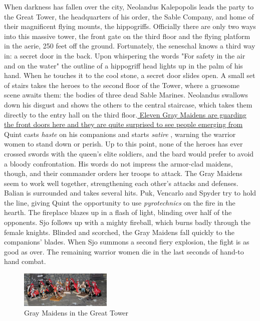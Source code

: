 When darkness has fallen over the city, Neolandus Kalepopolis leads the party to the Great Tower, the headquarters of his order, the Sable Company, and home of their magnificent flying mounts, the hippogriffs. Officially there are only two ways into this massive tower, the front gate on the third floor and the flying platform in the aerie, 250 feet off the ground. Fortunately, the seneschal knows a third way in: a secret door in the back. Upon whispering the words "For safety in the air and on the water" the outline of a hippogriff head lights up in the palm of his hand. When he touches it to the cool stone, a secret door slides open. A small set of stairs takes the heroes to the second floor of the Tower, where a gruesome scene awaits them: the bodies of three dead Sable Marines. Neolandus swallows down his disgust and shows the others to the central staircase, which takes them directly to the entry hall on the third floor.\hyperref[fig:Gray-Maidens-in-the-Great-Tower-567993387]{ Eleven Gray Maidens are guarding the front doors here and they are quite surprised to see people emerging from } Quint casts  {\itshape haste} on his companions and starts  {\itshape satire} , warning the warrior women to stand down or perish. Up to this point, none of the heroes has ever crossed swords with the queen's elite soldiers, and the bard would prefer to avoid a bloody confrontation. His words do not impress the armor-clad maidens, though, and their commander orders her troops to attack. The Gray Maidens seem to work well together, strengthening each other's attacks and defenses. Balian is surrounded and takes several hits. Puk, Vencarlo and Spyder try to hold the line, giving Quint the opportunity to use  {\itshape pyrotechnics} on the fire in the hearth. The fireplace blazes up in a flash of light, blinding over half of the opponents. Sjo follows up with a mighty fireball, which burns badly through the female knights. Blinded and scorched, the Gray Maidens fall quickly to the companions' blades. When Sjo summons a second fiery explosion, the fight is as good as over. The remaining warrior women die in the last seconds of hand-to hand combat. \\

\begin{figure}[h]
	\centering
	\includegraphics[width=0.39\textwidth]{images/Gray-Maidens-in-the-Great-Tower-567993387.jpg}
	\caption{Gray Maidens in the Great Tower}
	\label{fig:Gray-Maidens-in-the-Great-Tower-567993387}
\end{figure}

